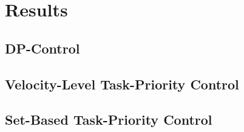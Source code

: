 \chapter{Results}

\section{DP-Control}

\section{Velocity-Level Task-Priority Control}

\section{Set-Based Task-Priority Control}
